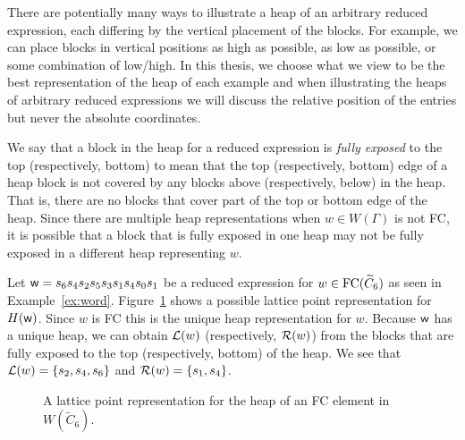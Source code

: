 There are potentially many ways to illustrate a heap of an arbitrary reduced expression, each differing by the vertical placement of the blocks. For example, we can place blocks in vertical positions as high as possible, as low as possible, or some combination of low/high. In this thesis, we choose what we view to be the best representation of the heap of each example and when illustrating the heaps of arbitrary reduced expressions we will discuss the relative position of the entries but never the absolute coordinates.

We say that a block in the heap for a reduced expression is \emph{fully exposed} to the top (respectively, bottom) to mean that the top (respectively, bottom) edge of a heap block is not covered by any blocks above (respectively, below) in the heap. That is, there are no blocks that cover part of the top or bottom edge of the heap. Since there are multiple heap representations when $w \in W(\Gamma)$ is not FC, it is possible that a block that is fully exposed in one heap may not be fully exposed in a different heap representing $w$. 

\begin{example}
	Let $\mathsf{w}=s_6s_4s_2s_5s_3s_1s_4s_0s_1$ be a reduced expression for $w \in \mathrm{FC}(\widetilde{C}_6)$ as seen in Example~\ref{ex:word}. Figure~\ref{fig:FC heap} shows a possible lattice point representation for $H(\mathsf{w})$. Since $w$ is FC this is the unique heap representation for $w$. Because $\mathsf{w}$ has a unique heap, we can obtain $\mathcal{L}(w)$ (respectively, $\mathcal{R}(w)$) from the blocks that are fully exposed to the top (respectively, bottom) of the heap. We see that $\mathcal{L}(w)=\{s_2,s_4,s_6\}$ and $\mathcal{R}(w)=\{s_1,s_4\}$.
\begin{figure}[h]
\centering
{}
\caption{A lattice point representation for the heap of an FC element in $W(\widetilde{C}_6)$.}
\label{fig:FC heap}
\end{figure}
\end{example}

